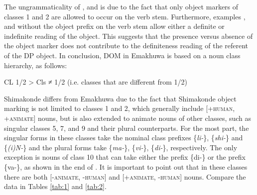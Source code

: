\documentclass[output=paper]{langsci/langscibook}
\begin{document}
The ungrammaticality of ,  and  is due to the fact that only object markers of classes 1 and 2 are allowed to occur on the verb stem. Furthermore, examples ,  and  without the object prefix on the verb stem allow either a definite or indefinite reading of the object. This suggests that the presence versus absence of the object marker does not contribute to the definiteness reading of the referent of the DP object. In conclusion, DOM in Emakhuwa is based on a noun class hierarchy, as follows:

\ea\label{ex:nguna:}
 CL 1/2 > Cls ≠ 1/2 (i.e. classes that are different from 1/2)
\z

{Shimakonde differs from Emakhuwa due to the fact that Shimakonde object marking is not limited to classes 1 and 2, which generally include [+}{\textsc{human}}{, +}{\textsc{animate}}{] nouns, but is also extended to animate nouns of other classes, such as singular classes 5, 7, and 9 and their plural counterparts.} {For the most part, }{the singular forms in these classes take the nominal class prefixes \{}{\textit{li-}}{\}, \{}{\textit{shi-}}{\} and \{}{\textit{(i)N-}}{\} and the plural forms take \{}{\textit{ma-}}{\}, \{}{\textit{vi-}}{\}, \{}{\textit{di-}}{\}, respectively. The only exception is nouns of class 10 that can take either the prefix \{di-\} or the prefix \{va-\}, as shown in the end of . }{It is important to point out that} {in these classes there are both [-}{\textsc{animate, -human}}{] and [+}{\textsc{animate, -human}}{] nouns. Compare the data in Tables \ref{tab:1} and \ref{tab:2}.}
\end{document}
